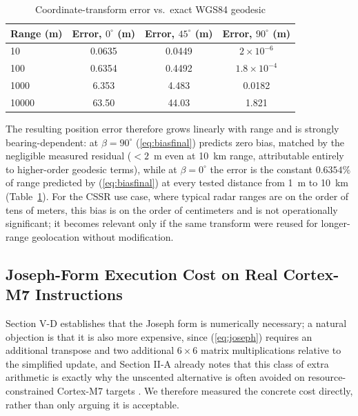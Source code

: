 \documentclass[conference]{IEEEtran}
\begin{document}
\begin{table}[htbp]
\caption{Coordinate-transform error vs.\ exact WGS84 geodesic}
\begin{center}
\begin{tabular}{@{}lccc@{}}
\toprule
\textbf{Range (m)} & \textbf{Error, $0^\circ$ (m)} & \textbf{Error, $45^\circ$ (m)} & \textbf{Error, $90^\circ$ (m)} \\
\midrule
10 & 0.0635 & 0.0449 & $2\times10^{-6}$ \\
100 & 0.6354 & 0.4492 & $1.8\times10^{-4}$ \\
1000 & 6.353 & 4.483 & 0.0182 \\
10000 & 63.50 & 44.03 & 1.821 \\
\bottomrule
\end{tabular}
\end{center}
\label{tab:geo}
\end{table}

The resulting position error therefore grows linearly with range and is strongly bearing-dependent: at $\beta=90^\circ$ (\ref{eq:biasfinal}) predicts zero bias, matched by the negligible measured residual ($<2$~m even at 10~km range, attributable entirely to higher-order geodesic terms), while at $\beta=0^\circ$ the error is the constant $0.6354\%$ of range predicted by (\ref{eq:biasfinal}) at every tested distance from 1~m to 10~km (Table~\ref{tab:geo}). For the CSSR use case, where typical radar ranges are on the order of tens of meters, this bias is on the order of centimeters and is not operationally significant; it becomes relevant only if the same transform were reused for longer-range geolocation without modification.

\subsection{Joseph-Form Execution Cost on Real Cortex-M7 Instructions}
\label{sec:timing}

Section V-D establishes that the Joseph form is numerically necessary; a natural objection is that it is also more expensive, since (\ref{eq:joseph}) requires an additional transpose and two additional $6\times6$ matrix multiplications relative to the simplified update, and Section II-A already notes that this class of extra arithmetic is exactly why the unscented alternative is often avoided on resource-constrained Cortex-M7 targets \cite{r2}. We therefore measured the concrete cost directly, rather than only arguing it is acceptable.
\end{document}
